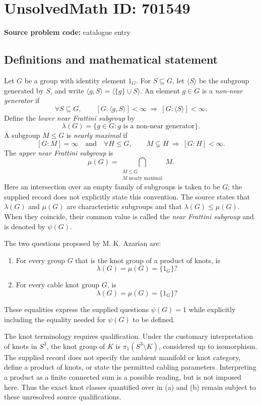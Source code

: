 \documentclass[11pt]{article}
\begin{document}
\section*{UnsolvedMath ID: 701549}
\textbf{Source problem code:} catalogue entry
\subsection{Definitions and mathematical statement}
Let \(G\) be a group with identity element \(1_G\). For \(S\subseteq G\), let \(\langle S\rangle\) be the subgroup generated by \(S\), and write \(\langle g,S\rangle=\langle\{g\}\cup S\rangle\). An element \(g\in G\) is a \emph{non-near generator} if
\[
\forall S\subseteq G,\qquad [G:\langle g,S\rangle]<\infty\ \Longrightarrow\ [G:\langle S\rangle]<\infty.
\]
Define the \emph{lower near Frattini subgroup} by
\[
\lambda(G)=\{g\in G:g\text{ is a non-near generator}\}.
\]
A subgroup \(M\leq G\) is \emph{nearly maximal} if
\[
[G:M]=\infty\quad\text{and}\quad
\forall H\leq G,\qquad M\subsetneq H\ \Longrightarrow\ [G:H]<\infty.
\]
The \emph{upper near Frattini subgroup} is
\[
\mu(G)=\bigcap_{\substack{M\leq G\\M\text{ nearly maximal}}}M.
\]
Here an intersection over an empty family of subgroups is taken to be \(G\); the supplied record does not explicitly state this convention. The source states that \(\lambda(G)\) and \(\mu(G)\) are characteristic subgroups and that \(\lambda(G)\leq\mu(G)\). When they coincide, their common value is called the \emph{near Frattini subgroup} and is denoted by \(\psi(G)\).

The two questions proposed by M. K. Azarian are:
\begin{enumerate}
\item[(a)] For every group \(G\) that is the knot group of a product of knots, is
\[
\lambda(G)=\mu(G)=\{1_G\}?
\]
\item[(b)] For every cable knot group \(G\), is
\[
\lambda(G)=\mu(G)=\{1_G\}?
\]
\end{enumerate}
These equalities express the supplied questions \(\psi(G)=1\) while explicitly including the equality needed for \(\psi(G)\) to be defined.

The knot terminology requires qualification. Under the customary interpretation of knots in \(S^3\), the knot group of \(K\) is \(\pi_1(S^3\setminus K)\), considered up to isomorphism. The supplied record does not specify the ambient manifold or knot category, define a product of knots, or state the permitted cabling parameters. Interpreting a product as a finite connected sum is a possible reading, but is not imposed here. Thus the exact knot classes quantified over in (a) and (b) remain subject to these unresolved source qualifications.
\end{document}
